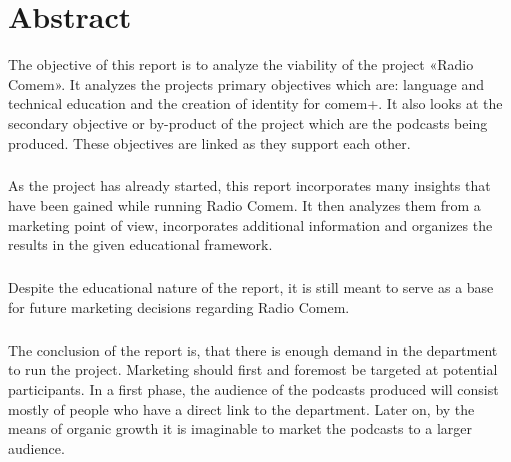 
\thispagestyle{scrheadings}

\begingroup
\let\clearpage\relax
\let\cleardoublepage\relax
\let\cleardoublepage\relax

\chapter*{Abstract} %

\noindent The objective of this report is to analyze the viability of the project «Radio Comem». It analyzes the projects primary objectives which are: language and technical education and the creation of identity for comem+. It also looks at the secondary objective or by-product of the project which are the podcasts being produced. These objectives are linked as they support each other.

\paragraph{} As the project has already started, this report incorporates many insights that have been gained while running Radio Comem. It then analyzes them from a marketing point of view, incorporates additional information and organizes the results in the given educational framework.

\paragraph{}Despite the educational nature of the report, it is still meant to serve as a base for future marketing decisions regarding Radio Comem.

\paragraph{}The conclusion of the report is, that there is enough demand in the department to run the project. Marketing should first and foremost be targeted at potential participants. In a first phase, the audience of the podcasts produced will consist mostly of people who have a direct link to the department. Later on, by the means of organic growth it is imaginable to market the podcasts to a larger audience.

\endgroup			

\vfill
